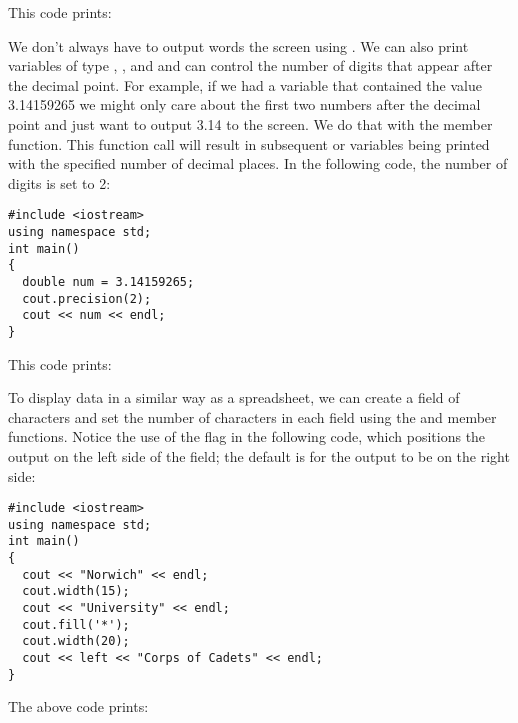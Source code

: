 \noindent This code prints: 


\noindent {}

We don't always have to output words the screen using . 
We can also print variables of type , , and  and can control the number of digits that appear after the decimal point. 
For example, if we had a variable that contained the value 3.14159265 we might only care about the first two numbers after the decimal point and just want to output 3.14 to the screen. 
We do that with the  member function. 
This function call will result in subsequent  or  variables being printed with the specified number of decimal places. 
In the following code, the number of digits is set to 2:

\noindent\begin{minipage}{\linewidth}\begin{lstlisting}
#include <iostream>
using namespace std;
int main()
{
  double num = 3.14159265;
  cout.precision(2);
  cout << num << endl;
}
\end{lstlisting}\end{minipage}

\noindent This code prints:

\noindent {}

To display data in a similar way as a spreadsheet, we can create a field of characters and set the number of characters in each field using the  and  member functions. 
Notice the use of the  flag in the following code, which positions the output on the left side of the field; the default is for the output to be on the right side:

\noindent\begin{minipage}{\linewidth}\begin{lstlisting}
#include <iostream>
using namespace std;
int main()
{
  cout << "Norwich" << endl;
  cout.width(15);
  cout << "University" << endl;
  cout.fill('*');
  cout.width(20);
  cout << left << "Corps of Cadets" << endl;
}
\end{lstlisting}\end{minipage}

\noindent The above code prints:

\noindent {}

\noindent {}

\noindent {}

